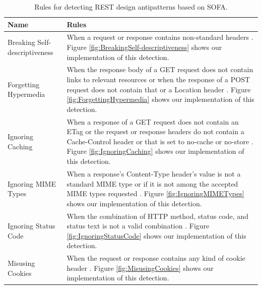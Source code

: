 \begin{table}[!ht]
\begin{center}
\small
\begin{tabular}{|p{5cm}|p{9cm}|}
\hline \textbf{Name} & \textbf{Rules} \\
\hline 
Breaking Self-descriptiveness &
When a request or response contains non-standard headers \cite{design}. Figure \ref{fig:BreakingSelf-descriptiveness} shows our implementation of this detection.


\\ \hline
Forgetting Hypermedia &
When the response body of a GET request does not contain links to relevant resources or when the response of a POST request does not contain that or a Location header \cite{design}. Figure \ref{fig:ForgettingHypermedia} shows our implementation of this detection.

\\ \hline
Ignoring Caching &
When a response of a GET request does not contain an ETag or the request or response headers do not contain a Cache-Control header or that is set to no-cache or no-store \cite{design}. Figure \ref{fig:IgnoringCaching} shows our implementation of this detection.

\\ \hline
Ignoring MIME Types &
When a response's Content-Type header's value is not a standard MIME type or if it is not among the accepted MIME types requested \cite{design}. Figure \ref{fig:IgnoringMIMETypes} shows our implementation of this detection.

\\ \hline
Ignoring Status Code &
When the combination of HTTP method, status code, and status text is not a valid combination \cite{design}. Figure \ref{fig:IgnoringStatusCode} shows our implementation of this detection.

\\ \hline
Misusing Cookies &
When the request or response contains any kind of cookie header \cite{design}. Figure \ref{fig:MisusingCookies} shows our implementation of this detection.

\\ \hline
\end{tabular}
 \caption{Rules for detecting REST design antipatterns based on SOFA.}
 \label{tab:RulesfordetectingRESTdesignantipatterns}
 \end{center}
\end{table}

\clearpage

